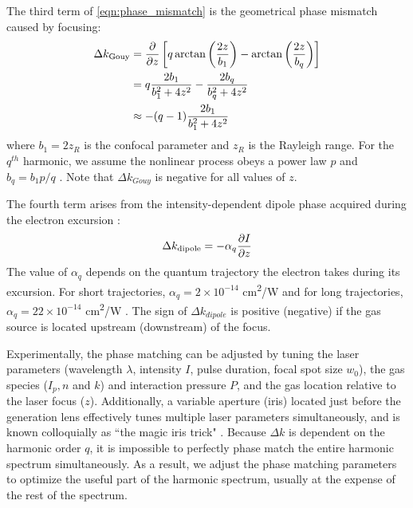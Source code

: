 The third term of \cref{eqn:phase_mismatch} is the geometrical phase mismatch caused by focusing:
\begin{align}
\Delta k_{\textrm{Gouy}} &= \pdv{z} \left[ q \arctan\left( \frac{2 z}{b_1} \right) - \arctan \left( \frac{2 z}{b_q} \right) \right] \nonumber \\
&= q \frac{2 b_1}{b_1^2 + 4 z^2} - \frac{2 b_q}{b_q^2 + 4 z^2} \nonumber \\
&\approx -(q-1) \frac{2 b_1}{b_1^2 + 4 z^2}
\end{align}
where $b_1 = 2 z_R$ is the confocal parameter and $z_R$ is the Rayleigh range. For the $q^{th}$ harmonic, we assume the nonlinear process obeys a power law $p$ and $b_q = b_1 p /q$ \cite{schounAttosecondHighHarmonicSpectroscopy2015}. Note that $\Delta k_{Gouy}$ is negative for all values of $z$.

The fourth term arises from the intensity-dependent dipole phase acquired during the electron excursion \cite{lewensteinTheoryHighharmonicGeneration1994,balcouGeneralizedPhasematchingConditions1997,salieresCoherenceControlHighOrder1995}:
\begin{equation}
\Delta k_{\textrm{dipole}} = - \alpha_q \pdv{I}{z}
\label{eqn:deltak_atomic}
\end{equation}
The value of $\alpha_q$ depends on the quantum trajectory the electron takes during its excursion. For short trajectories, {$\alpha_q = 2 \times 10^{-14}$ cm\textsuperscript{2}/W} and for long trajectories, {$\alpha_q = 22 \times 10^{-14}$ cm\textsuperscript{2}/W} \cite{kazamiasPressureinducedPhaseMatching2011,balcouQuantumpathAnalysisPhase1999}. The sign of $\Delta k_{dipole}$ is positive (negative) if the gas source is located upstream (downstream) of the focus.

Experimentally, the phase matching can be adjusted by tuning the laser parameters (wavelength $\lambda$, intensity $I$, pulse duration, focal spot size $w_0$), the gas species ($I_p, n$ and $k$) and interaction pressure $P$, and the gas location relative to the laser focus ($z$). Additionally, a variable aperture (iris) located just before the generation lens effectively tunes multiple laser parameters simultaneously, and is known colloquially as ``the magic iris trick" \cite{kazamiasHighOrderHarmonic2002}. Because $\Delta k$ is dependent on the harmonic order $q$, it is impossible to perfectly phase match the entire harmonic spectrum simultaneously. As a result, we adjust the phase matching parameters to optimize the useful part of the harmonic spectrum, usually at the expense of the rest of the spectrum.

